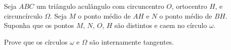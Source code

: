 Seja $ABC$ um triângulo aculângulo com circuncentro $O$, ortocentro $H$, e circuncírculo $\Omega$.
Seja $M$ o ponto médio de $AH$ e $N$ o ponto médio de $BH$.
Suponha que os pontos $M$,  $N$,  $O$,  $H$ são distintos e caem no círculo $\omega$.

Prove que os círculos $\omega$ e $\Omega$ são internamente tangentes.

